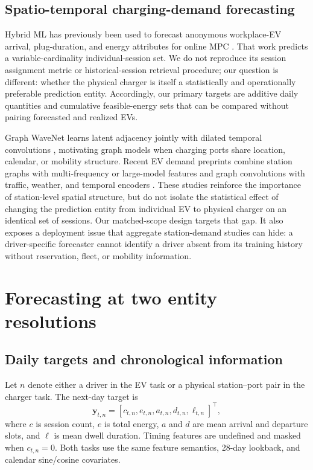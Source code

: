 \documentclass[11pt]{article}
\begin{document}
\subsection{Spatio-temporal charging-demand forecasting}

Hybrid ML has previously been used to forecast anonymous workplace-EV
arrival, plug-duration, and energy attributes for online MPC
\citep{mcclone2024hybrid}.  That work predicts a variable-cardinality
individual-session set.  We do not reproduce its session assignment metric or
historical-session retrieval procedure; our question is different: whether
the physical charger is itself a statistically and operationally preferable
prediction entity.  Accordingly, our primary targets are additive daily
quantities and cumulative feasible-energy sets that can be compared without
pairing forecasted and realized EVs.

Graph WaveNet learns latent adjacency jointly with dilated temporal
convolutions \citep{wu2019graphwavenet}, motivating graph models when charging
ports share location, calendar, or mobility structure.  Recent EV demand
preprints combine station graphs with multi-frequency or large-model features
\citep{fan2025evstllm} and graph convolutions with traffic, weather, and
temporal encoders \citep{tupayachi2025twgcn}.  These studies reinforce the
importance of station-level spatial structure, but do not isolate the
statistical effect of changing the prediction entity from individual EV to
physical charger on an identical set of sessions.  Our matched-scope design
targets that gap.  It also exposes a deployment issue that aggregate
station-demand studies can hide: a driver-specific forecaster cannot identify
a driver absent from its training history without reservation, fleet, or
mobility information.

\section{Forecasting at two entity resolutions}
\subsection{Daily targets and chronological information}

Let \(n\) denote either a driver in the EV task or a physical
station--port pair in the charger task.  The next-day target is
\begin{equation}
 \mathbf y_{t,n}=
 [c_{t,n},e_{t,n},a_{t,n},d_{t,n},\ell_{t,n}]^\top,       \label{eq:paneltarget}
\end{equation}
where \(c\) is session count, \(e\) is total energy, \(a\) and \(d\) are mean
arrival and departure slots, and \(\ell\) is mean dwell duration.  Timing
features are undefined and masked when \(c_{t,n}=0\).  Both tasks use the same
feature semantics, 28-day lookback, and calendar sine/cosine covariates.
\end{document}
